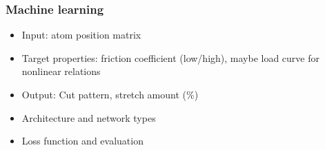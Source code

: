 \documentclass[UKenglish]{book}
\begin{document}
\subsubsection*{Machine learning}
\begin{itemize}
  \item Input: atom position matrix
  \item Target properties: friction coefficient (low/high), maybe load curve for nonlinear relations
  \item Output: Cut pattern, stretch amount (\%)
  \item Architecture and network types
  \item Loss function and evaluation
\end{itemize}






% 
% 
% 
% 

%

%                

% 
% 
% 


% 
%   
% 
% 
% 
\end{document}
